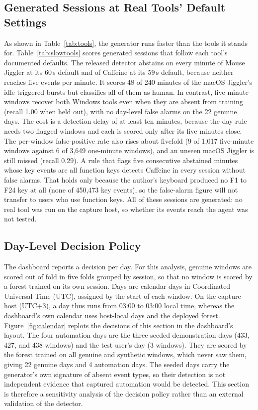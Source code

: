 \documentclass[sensors,article,submit,pdftex,oneauthor]{Definitions/mdpi}
\begin{document}
\subsection{Generated Sessions at Real Tools' Default Settings}
\label{sec:slowtools}
As shown in Table~\ref{tab:tools}, the generator runs faster than the tools it stands for. Table~\ref{tab:slowtools} scores generated sessions that follow each tool's documented defaults. The released detector abstains on every minute of Mouse Jiggler at its 60\,s default and of Caffeine at its 59\,s default, because neither reaches five events per minute. It scores 48 of 240 minutes of the macOS Jiggler's idle-triggered bursts but classifies all of them as human. In contrast, five-minute windows recover both Windows tools even when they are absent from training (recall 1.00 when held out), with no day-level false alarms on the 22 genuine days. The cost is a detection delay of at least ten minutes, because the day rule needs two flagged windows and each is scored only after its five minutes close. The per-window false-positive rate also rises about fivefold (9 of 1,017 five-minute windows against 6 of 3,649 one-minute windows), and an unseen macOS Jiggler is still missed (recall 0.29). A rule that flags five consecutive abstained minutes whose key events are all function keys detects Caffeine in every session without false alarms. That holds only because the author's keyboard produced no F1 to F24 key at all (none of 450,473 key events), so the false-alarm figure will not transfer to users who use function keys. All of these sessions are generated: no real tool was run on the capture host, so whether its events reach the agent was not tested.



\subsection{Day-Level Decision Policy}
\label{sec:daypolicy}
The dashboard reports a decision per day. For this analysis, genuine windows are scored out of fold in five folds grouped by session, so that no window is scored by a forest trained on its own session. Days are calendar days in Coordinated Universal Time (UTC), assigned by the start of each window. On the capture host (UTC+3), a day thus runs from 03:00 to 03:00 local time, whereas the dashboard's own calendar uses host-local days and the deployed forest. Figure~\ref{fig:calendar} replots the decisions of this section in the dashboard's layout. The four automation days are the three seeded demonstration days (433, 427, and 438 windows) and the test user's day (3 windows). They are scored by the forest trained on all genuine and synthetic windows, which never saw them, giving 22 genuine days and 4 automation days. The seeded days carry the generator's own signature of absent event types, so their detection is not independent evidence that captured automation would be detected. This section is therefore a sensitivity analysis of the decision policy rather than an external validation of the detector.
\end{document}
